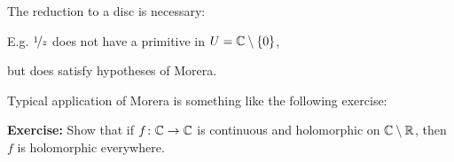 \documentclass[10pt,aspectratio=169]{beamer}
\begin{document}
\begin{frame}
The reduction to a disc is necessary:

E.g. $\nicefrac{1}{z}$
does not have a primitive in $U = {\mathbb{C}} \setminus \{ 0 \}$,

but does
satisfy hypotheses of Morera.

\medskip
\pause

Typical application of Morera is something like the following exercise:

\medskip
\pause

\textbf{Exercise:}
Show that if $f \colon {\mathbb{C}} \to {\mathbb{C}}$ is continuous and holomorphic on ${\mathbb{C}}
\setminus {\mathbb{R}}$, then $f$ is holomorphic everywhere.
\end{frame}
\end{document}
